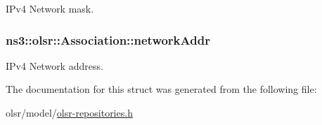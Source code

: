 I\+Pv4 Network mask. 

\subsubsection[{\texorpdfstring{network\+Addr}{networkAddr}}]{ ns3\+::olsr\+::\+Association\+::network\+Addr}\hypertarget{structns3_1_1olsr_1_1Association_a7531aa2dfac70c11d9f1a840b9eba0bf}{}\label{structns3_1_1olsr_1_1Association_a7531aa2dfac70c11d9f1a840b9eba0bf}


I\+Pv4 Network address. 



The documentation for this struct was generated from the following file\+:\begin{DoxyCompactItemize}
\item 
olsr/model/\hyperlink{olsr-repositories_8h}{olsr-\/repositories.\+h}\end{DoxyCompactItemize}
